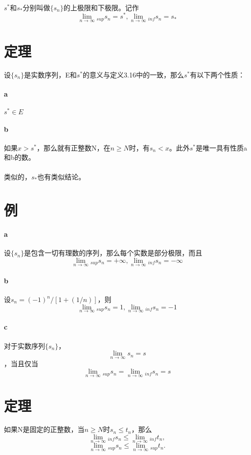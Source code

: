 \paragraph{} $s^*$和$s_*$分别叫做$\{s_n\}$的上极限和下极限。记作$$ \lim_{n\to \infty} {_{sup}s_n} = s^*,  \lim_{n \to \infty}{_{inf}s_n} = s_* $$
\section{定理} 设$\{s_n\}$是实数序列，E和$s^*$的意义与定义3.16中的一致，那么$s^*$有以下两个性质：
\paragraph{a} $s^* \in E$
\paragraph{b} 如果$x > s^*$，那么就有正整数N，在$n \ge N$时，有$s_n < x $。此外$s^*$是唯一具有性质a和b的数。
\paragraph{} 类似的，$s_*$也有类似结论。
\section{例}
\paragraph{a} 设$\{s_n\}$是包含一切有理数的序列，那么每个实数是部分极限，而且$$ \lim_{n\to \infty} {_{sup}s_n} = +\infty,  \lim_{n \to \infty}{_{inf}s_n} = -\infty $$
\paragraph{b} 设$s_n = (-1)^n/[1 + (1/n)]$，则 $$ \lim_{n\to \infty} {_{sup}s_n} = 1,  \lim_{n \to \infty}{_{inf}s_n} = -1 $$
\paragraph{c} 对于实数序列$\{s_n\}$，$$ \lim_{n\to \infty} {s_n} = s$$，当且仅当$$ \lim_{n\to \infty} {_{sup}s_n} = \lim_{n\to \infty} {_{inf}s_n} = s$$
\section{定理} 如果N是固定的正整数，当$n \ge N$时$s_n \le t_n$，那么$$ \lim_{n\to \infty} {_{inf}s_n} \le \lim_{n\to \infty} {_{inf}t_n},$$ $$ \lim_{n\to \infty} {_{sup}s_n} \le \lim_{n\to \infty} {_{sup}t_n}.$$
\subparagraph{}
